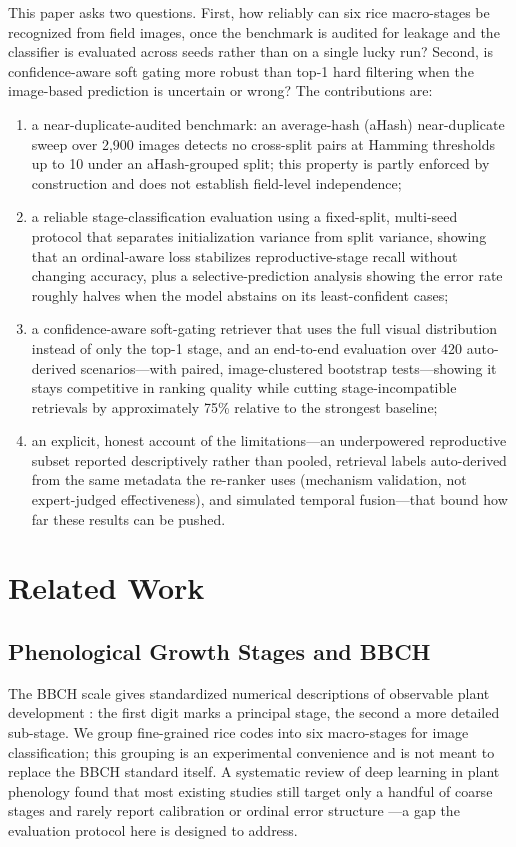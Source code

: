 \documentclass[conference]{IEEEtran}
\begin{document}
This paper asks two questions. First, how reliably can six rice macro-stages be recognized from field images, once the benchmark is audited for leakage and the classifier is evaluated across seeds rather than on a single lucky run? Second, is confidence-aware soft gating more robust than top-1 hard filtering when the image-based prediction is uncertain or wrong? The contributions are:
\begin{enumerate}
    \item a near-duplicate-audited benchmark: an average-hash (aHash) near-duplicate sweep over 2{,}900 images detects no cross-split pairs at Hamming thresholds up to 10 under an aHash-grouped split; this property is partly enforced by construction and does not establish field-level independence;
    \item a reliable stage-classification evaluation using a fixed-split, multi-seed protocol that separates initialization variance from split variance, showing that an ordinal-aware loss stabilizes reproductive-stage recall without changing accuracy, plus a selective-prediction analysis showing the error rate roughly halves when the model abstains on its least-confident cases;
    \item a confidence-aware soft-gating retriever that uses the full visual distribution instead of only the top-1 stage, and an end-to-end evaluation over 420 auto-derived scenarios---with paired, image-clustered bootstrap tests---showing it stays competitive in ranking quality while cutting stage-incompatible retrievals by approximately 75\% relative to the strongest baseline;
    \item an explicit, honest account of the limitations---an underpowered reproductive subset reported descriptively rather than pooled, retrieval labels auto-derived from the same metadata the re-ranker uses (mechanism validation, not expert-judged effectiveness), and simulated temporal fusion---that bound how far these results can be pushed.
\end{enumerate}

\section{Related Work}

\subsection{Phenological Growth Stages and BBCH}

The BBCH scale gives standardized numerical descriptions of observable plant development \cite{meier2001bbch,lancashire1991uniform}: the first digit marks a principal stage, the second a more detailed sub-stage. We group fine-grained rice codes into six macro-stages for image classification; this grouping is an experimental convenience and is not meant to replace the BBCH standard itself. A systematic review of deep learning in plant phenology found that most existing studies still target only a handful of coarse stages and rarely report calibration or ordinal error structure \cite{katal2022deep}---a gap the evaluation protocol here is designed to address.
\end{document}
